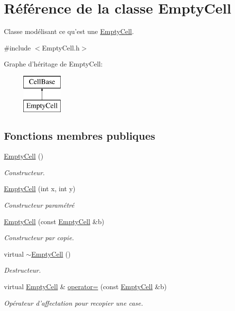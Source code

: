 \hypertarget{class_empty_cell}{\section{Référence de la classe Empty\-Cell}
\label{class_empty_cell}
}


Classe modélisant ce qu'est une \hyperlink{class_empty_cell}{Empty\-Cell}.  




{\ttfamily \#include $<$Empty\-Cell.\-h$>$}

Graphe d'héritage de Empty\-Cell\-:\begin{figure}[H]
\begin{center}
\leavevmode
\includegraphics[height=2.000000cm]{class_empty_cell}
\end{center}
\end{figure}
\subsection*{Fonctions membres publiques}
\begin{DoxyCompactItemize}
\item 
\hyperlink{class_empty_cell_a1871cc46e277bf054e2fd9110f9030c3}{Empty\-Cell} ()
\begin{DoxyCompactList}\small\item\em Constructeur. \end{DoxyCompactList}\item 
\hyperlink{class_empty_cell_af51608a40bca4fb2d60be1882d7362da}{Empty\-Cell} (int x, int y)
\begin{DoxyCompactList}\small\item\em Constructeur paramétré \end{DoxyCompactList}\item 
\hyperlink{class_empty_cell_a888aa15c6c3dc2e882b42a78ee944432}{Empty\-Cell} (const \hyperlink{class_empty_cell}{Empty\-Cell} \&b)
\begin{DoxyCompactList}\small\item\em Constructeur par copie. \end{DoxyCompactList}\item 
virtual \hyperlink{class_empty_cell_a9a91934198895391fca6eac0b2fca9f5}{$\sim$\-Empty\-Cell} ()
\begin{DoxyCompactList}\small\item\em Destructeur. \end{DoxyCompactList}\item 
virtual \hyperlink{class_empty_cell}{Empty\-Cell} \& \hyperlink{class_empty_cell_a2b069d427ca55af2cba75382d8e7bb6f}{operator=} (const \hyperlink{class_empty_cell}{Empty\-Cell} \&b)
\begin{DoxyCompactList}\small\item\em Opérateur d'affectation pour recopier une case. \end{DoxyCompactList}\end{DoxyCompactItemize}
